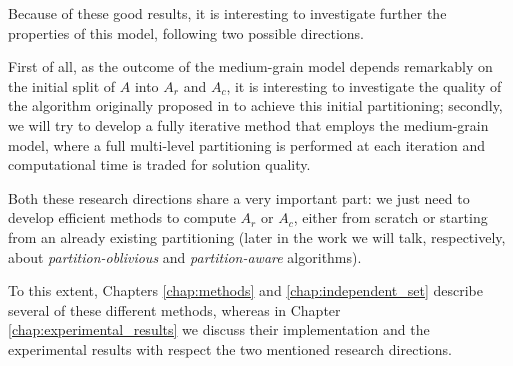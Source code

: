 Because of these good results, it is interesting to investigate further the properties of this model, following two possible directions.

First of all, as the outcome of the medium-grain model depends remarkably on the initial split of $A$ into $A_r$ and $A_c$, it is interesting to investigate the quality of the algorithm originally proposed in \cite{mondriaan} to achieve this initial partitioning; secondly, we will try to develop a fully iterative method that employs the medium-grain model, where a full multi-level partitioning is performed at each iteration and computational time is traded for solution quality.

Both these research directions share a very important part: we just need to develop efficient methods to compute $A_r$ or $A_c$, either from scratch or starting from an already existing partitioning (later in the work we will talk, respectively, about \emph{partition-oblivious} and \emph{partition-aware} algorithms). 

To this extent, Chapters \ref{chap:methods} and \ref{chap:independent_set} describe several of these different methods, whereas in Chapter \ref{chap:experimental_results} we discuss their implementation and the experimental results with respect the two mentioned research directions.
